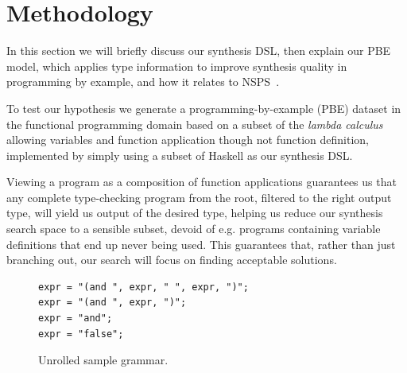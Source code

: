 \documentclass{article} %
\begin{document}
\section{Methodology} %

In this section we will briefly discuss our synthesis DSL, then explain our PBE model,
which applies type information to improve synthesis quality in programming by example,
and how it relates to NSPS~\citet{nsps}.
%

To test our hypothesis we generate a programming-by-example (PBE) dataset in the functional programming domain
based on a subset of the \emph{lambda calculus}~\citep{church1940formulation}
allowing variables and function application though not function definition,
implemented by simply using a subset of Haskell as our synthesis DSL.

Viewing a program as a composition of function applications guarantees us that any complete type-checking program from the root,
filtered to the right output type, will yield us output of the desired type,
helping us reduce our synthesis search space to a sensible subset,
devoid of e.g. programs containing variable definitions that end up never being used.
This guarantees that, rather than just branching out,
our search will focus on finding acceptable solutions.

\begin{figure}
    \begin{verbatim}
expr = "(and ", expr, " ", expr, ")";
expr = "(and ", expr, ")";
expr = "and";
expr = "false";
    \end{verbatim}
    \caption{Unrolled sample grammar.}
    \label{fig:dsl}
\end{figure}
\end{document}
